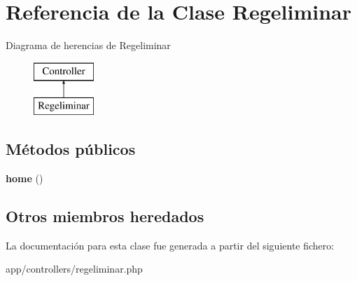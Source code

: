\hypertarget{class_regeliminar}{}\section{Referencia de la Clase Regeliminar}
\label{class_regeliminar}
Diagrama de herencias de Regeliminar\begin{figure}[H]
\begin{center}
\leavevmode
\includegraphics[height=2.000000cm]{class_regeliminar}
\end{center}
\end{figure}
\subsection*{Métodos públicos}
\begin{DoxyCompactItemize}
\item 
\hypertarget{class_regeliminar_a174b8e4c7d4d7363c6f773671defdeff}{}{\bfseries home} ()\label{class_regeliminar_a174b8e4c7d4d7363c6f773671defdeff}

\end{DoxyCompactItemize}
\subsection*{Otros miembros heredados}


La documentación para esta clase fue generada a partir del siguiente fichero\+:\begin{DoxyCompactItemize}
\item 
app/controllers/regeliminar.\+php\end{DoxyCompactItemize}

